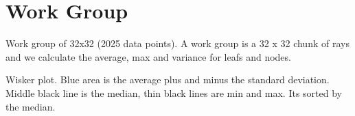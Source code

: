
\section{Work Group}



Work group of 32x32 (2025 data points). A work group is a 32 x 32 chunk of rays and we calculate the average, max and variance for leafs and nodes. 

Wisker plot. Blue area is the average plus and minus the standard deviation. Middle black line is the median, thin black lines are min and max. Its sorted by the median.

\iffalse
\begin{minipage}[t]{0.9\textwidth}
	\begin{tikzpicture}
	\begin{axis}
	[
	view={0}{0},
	xlabel = max node intersections,
	ylabel = standard deviation,
	cycle list name = linestyles*,
	legend style={at={(0.05,0.95)}, anchor = north west},
	]
	\addplot+[mark=square*, only marks, mark options={scale=0.2},scatter, scatter/use mapped color= {draw opacity = 0}, opacity = 0.2]table[x = nodeMax, y = nodeStandardDeviation, col sep=comma]{Data/amazonLumberyardInterior_b4_l4_WorkGroupDepthInfo.txt};			
	
	\end{axis}
	\end{tikzpicture}
\end{minipage}


\begin{minipage}[t]{0.9\textwidth}
	\begin{tikzpicture}
	\begin{axis}
	[
	view={0}{0},
	xlabel = max leaf intersections,
	ylabel = standard deviation,
	cycle list name = linestyles*,
	legend style={at={(0.05,0.95)}, anchor = north west},
	]
	\addplot[only marks,mark=square*, mark options={scale=0.5},scatter, scatter/use mapped color= {draw opacity = 0}, opacity = 0.1] table[x = leafMax, y = leafStandardDeviation, col sep=comma]{Data/amazonLumberyardInterior_b4_l4_WorkGroupDepthInfo.txt};			
	
	\end{axis}
	\end{tikzpicture}
\end{minipage}
\fi



